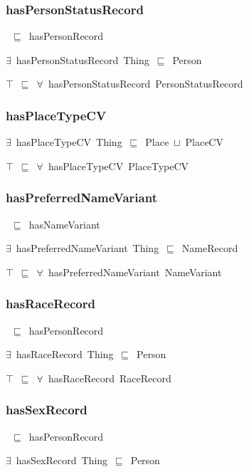 \documentclass{article}
\begin{document}
\subsubsection*{hasPersonStatusRecord}

~\ensuremath{\sqsubseteq}~hasPersonRecord

\ensuremath{\exists}~hasPersonStatusRecord~Thing~\ensuremath{\sqsubseteq}~Person

\ensuremath{\top}~\ensuremath{\sqsubseteq}~\ensuremath{\forall}~hasPersonStatusRecord~PersonStatusRecord

\subsubsection*{hasPlaceTypeCV}

\ensuremath{\exists}~hasPlaceTypeCV~Thing~\ensuremath{\sqsubseteq}~Place~\ensuremath{\sqcup}~PlaceCV

\ensuremath{\top}~\ensuremath{\sqsubseteq}~\ensuremath{\forall}~hasPlaceTypeCV~PlaceTypeCV

\subsubsection*{hasPreferredNameVariant}

~\ensuremath{\sqsubseteq}~hasNameVariant

\ensuremath{\exists}~hasPreferredNameVariant~Thing~\ensuremath{\sqsubseteq}~NameRecord

\ensuremath{\top}~\ensuremath{\sqsubseteq}~\ensuremath{\forall}~hasPreferredNameVariant~NameVariant

\subsubsection*{hasRaceRecord}

~\ensuremath{\sqsubseteq}~hasPersonRecord

\ensuremath{\exists}~hasRaceRecord~Thing~\ensuremath{\sqsubseteq}~Person

\ensuremath{\top}~\ensuremath{\sqsubseteq}~\ensuremath{\forall}~hasRaceRecord~RaceRecord

\subsubsection*{hasSexRecord}

~\ensuremath{\sqsubseteq}~hasPersonRecord

\ensuremath{\exists}~hasSexRecord~Thing~\ensuremath{\sqsubseteq}~Person
\end{document}
